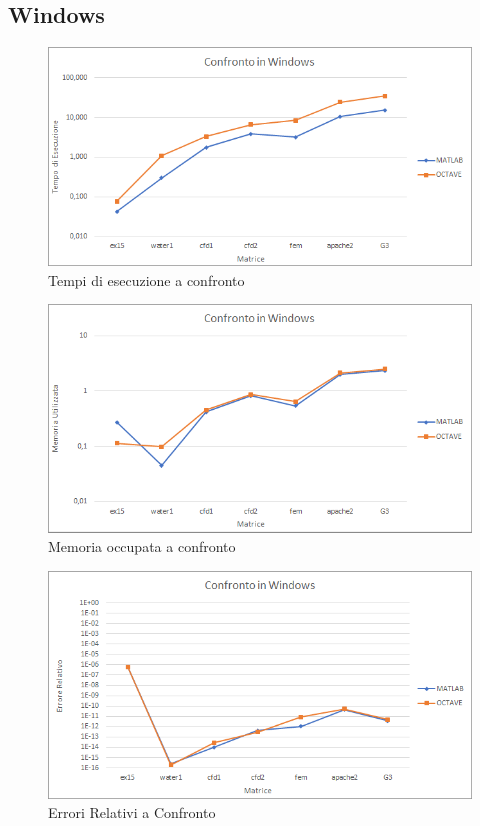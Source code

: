 \documentclass[a4paper,12pt,titlepage,oneside]{book}
\begin{document}
        \subsection{Windows}
        \begin{figure}[h]
            \centering
            \includegraphics[scale=0.8]{src/plot/WINtime.png}
            \caption{Tempi di esecuzione a confronto}
            \label{plot:timewin}
        \end{figure}
        
        \begin{figure}[h]
            \centering
            \includegraphics[scale=0.8]{src/plot/WINmem.png}
            \caption{Memoria occupata a confronto}
            \label{plot:memwin}
        \end{figure}
        
        \begin{figure}[h]
            \centering
            \includegraphics[scale=0.8]{src/plot/WINerr.png}
            \caption{Errori Relativi a Confronto}
            \label{plot:errwin}
        \end{figure}
        
\end{document}

